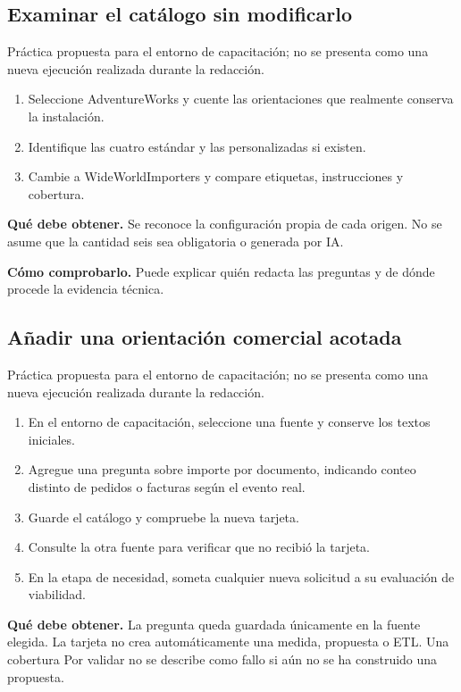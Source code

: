 \subsection{Examinar el catálogo sin modificarlo}
Práctica propuesta para el entorno de capacitación; no se presenta como una nueva ejecución realizada durante la redacción.

\begin{enumerate}
\item Seleccione AdventureWorks y cuente las orientaciones que realmente conserva la instalación.
\item Identifique las cuatro estándar y las personalizadas si existen.
\item Cambie a WideWorldImporters y compare etiquetas, instrucciones y cobertura.
\end{enumerate}

\textbf{Qué debe obtener.} Se reconoce la configuración propia de cada origen. No se asume que la cantidad seis sea obligatoria o generada por IA.

\textbf{Cómo comprobarlo.} Puede explicar quién redacta las preguntas y de dónde procede la evidencia técnica.

\subsection{Añadir una orientación comercial acotada}
Práctica propuesta para el entorno de capacitación; no se presenta como una nueva ejecución realizada durante la redacción.

\begin{enumerate}
\item En el entorno de capacitación, seleccione una fuente y conserve los textos iniciales.
\item Agregue una pregunta sobre importe por documento, indicando conteo distinto de pedidos o facturas según el evento real.
\item Guarde el catálogo y compruebe la nueva tarjeta.
\item Consulte la otra fuente para verificar que no recibió la tarjeta.
\item En la etapa de necesidad, someta cualquier nueva solicitud a su evaluación de viabilidad.
\end{enumerate}

\textbf{Qué debe obtener.} La pregunta queda guardada únicamente en la fuente elegida. La tarjeta no crea automáticamente una medida, propuesta o ETL. Una cobertura Por validar no se describe como fallo si aún no se ha construido una propuesta.

